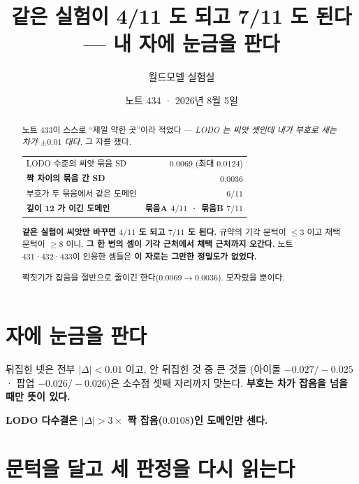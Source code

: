 \documentclass[11pt]{article}
\begin{document}
\title{같은 실험이 4/11 도 되고 7/11 도 된다 --- 내 자에 눈금을 판다}
\author{월드모델 실험실}
\date{노트 434 · 2026년 8월 5일}
\maketitle

\begin{abstract}
노트 433이 스스로 ``제일 약한 곳''이라 적었다 --- \emph{LODO 는 씨앗 셋인데
내가 부호로 세는 차가 $\pm 0.01$ 대다.} 그 자를 쟀다.

\begin{center}
\begin{tabular}{lr}
\hline
LODO 수준의 씨앗 묶음 SD & $0.0069$ (최대 $0.0124$) \\
\textbf{짝 차이의 묶음 간 SD} & $\mathbf{0.0036}$ \\
\hline
부호가 두 묶음에서 같은 도메인 & $6/11$ \\
\textbf{깊이 12 가 이긴 도메인} & \textbf{묶음A $4/11$ · 묶음B $7/11$} \\
\hline
\end{tabular}
\end{center}

\textbf{같은 실험이 씨앗만 바꾸면 $4/11$ 도 되고 $7/11$ 도 된다.} 규약의
기각 문턱이 $\le 3$ 이고 채택 문턱이 $\ge 8$ 이니, \textbf{그 한 번의 셈이
기각 근처에서 채택 근처까지 오간다.} 노트 431·432·433이 인용한 셈들은
\textbf{이 자로는 그만한 정밀도가 없었다.}

짝짓기가 잡음을 절반으로 줄이긴 한다($0.0069 \to 0.0036$). 모자랐을 뿐이다.
\end{abstract}

\section{자에 눈금을 판다}

뒤집힌 넷은 전부 $|\Delta| < 0.01$ 이고, 안 뒤집힌 것 중 큰 것들
(아이돌 $-0.027/-0.025$ · 팝업 $-0.026/-0.026$)은 소수점 셋째 자리까지 맞는다.
\textbf{부호는 차가 잡음을 넘을 때만 뜻이 있다.}

\begin{center}
\textbf{LODO 다수결은 $|\Delta| > 3 \times$ 짝 잡음($0.0108$)인 도메인만
센다.}
\end{center}

\section{문턱을 달고 세 판정을 다시 읽는다}
\end{document}
